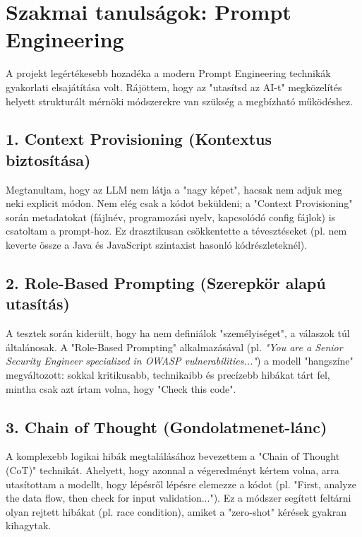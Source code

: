 \documentclass[a4paper,12pt]{article}
\begin{document}
\vspace{1em}

\section{Szakmai tanulságok: Prompt Engineering}

A projekt legértékesebb hozadéka a modern Prompt Engineering technikák gyakorlati elsajátítása volt. Rájöttem, hogy az "utasítsd az AI-t" megközelítés helyett strukturált mérnöki módszerekre van szükség a megbízható működéshez.

\subsection*{1. Context Provisioning (Kontextus biztosítása)}
Megtanultam, hogy az LLM nem látja a "nagy képet", hacsak nem adjuk meg neki explicit módon. Nem elég csak a kódot beküldeni; a "Context Provisioning" során metadatokat (fájlnév, programozási nyelv, kapcsolódó config fájlok) is csatoltam a prompt-hoz. Ez drasztikusan csökkentette a tévesztéseket (pl. nem keverte össze a Java és JavaScript szintaxist hasonló kódrészleteknél).

\vspace{0.5em}

\subsection*{2. Role-Based Prompting (Szerepkör alapú utasítás)}
A tesztek során kiderült, hogy ha nem definiálok "személyiséget", a válaszok túl általánosak. A "Role-Based Prompting" alkalmazásával (pl. \textit{"You are a Senior Security Engineer specialized in OWASP vulnerabilities..."}) a modell "hangszíne" megváltozott: sokkal kritikusabb, technikaibb és precízebb hibákat tárt fel, mintha csak azt írtam volna, hogy "Check this code".

\vspace{0.5em}

\subsection*{3. Chain of Thought (Gondolatmenet-lánc)}
A komplexebb logikai hibák megtalálásához bevezettem a "Chain of Thought (CoT)" technikát. Ahelyett, hogy azonnal a végeredményt kértem volna, arra utasítottam a modellt, hogy lépésről lépésre elemezze a kódot (pl. "First, analyze the data flow, then check for input validation..."). Ez a módszer segített feltárni olyan rejtett hibákat (pl. race condition), amiket a "zero-shot" kérések gyakran kihagytak.
\end{document}
